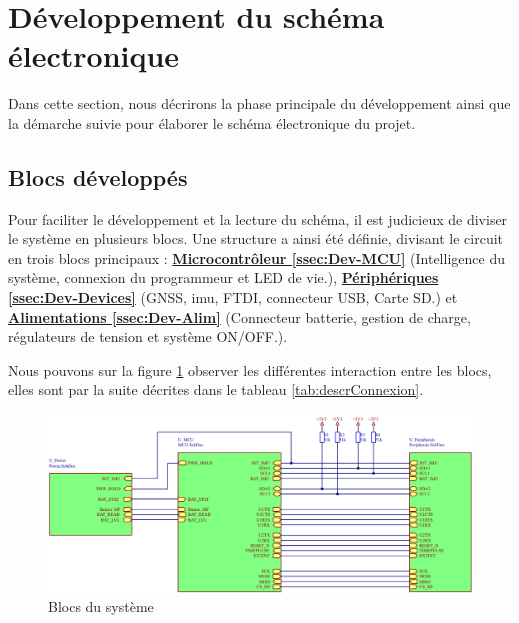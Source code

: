 \section{Développement du schéma électronique} \label{sec:Dev-Schematique}
Dans cette section, nous décrirons la phase principale du développement ainsi que la démarche suivie pour élaborer le schéma électronique du projet.

\subsection{Blocs développés} \label{ssec:Dev-blocs}
Pour faciliter le développement et la lecture du schéma, il est judicieux de diviser le système en plusieurs blocs. Une structure a ainsi été définie, divisant le circuit en trois blocs principaux : \hyperref[ssec:Dev-MCU]{\textbf{Microcontrôleur \ref{ssec:Dev-MCU}}} (Intelligence du système, connexion du programmeur et LED de vie.), \hyperref[ssec:Dev-Devices]{\textbf{Périphériques \ref{ssec:Dev-Devices}}} (\gls{GNSS}, \gls{imu}, \gls{FTDI}, connecteur USB, Carte SD.) et \hyperref[ssec:Dev-Alim]{\textbf{Alimentations \ref{ssec:Dev-Alim}}} (Connecteur batterie, gestion de charge, régulateurs de tension et système ON/OFF.).

Nous pouvons sur la figure \ref{fig:blocs} observer les différentes interaction entre les blocs, elles sont par la suite décrites dans le tableau \ref{tab:descrConnexion}.

\begin{figure}[h]
	\centering
	\includegraphics[width=.85\linewidth]{../figures/etude/sch/BLOCS}
	\caption{Blocs du système}
	\label{fig:blocs}
\end{figure}


